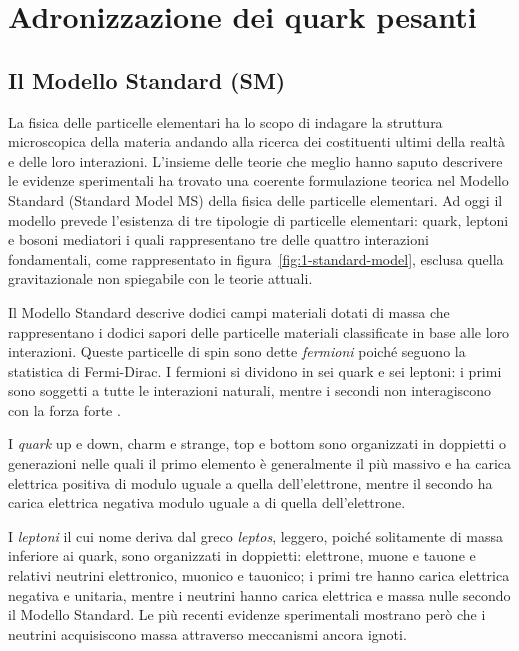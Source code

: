 \chapter{Adronizzazione dei quark pesanti}

\section{Il Modello Standard (SM)}
\label{sec:SM}
    La fisica delle particelle elementari ha lo scopo di indagare la struttura microscopica della materia andando alla ricerca dei costituenti ultimi della realtà e delle loro interazioni. L'insieme delle teorie che meglio hanno saputo descrivere le evidenze sperimentali ha trovato una coerente formulazione teorica nel Modello Standard (Standard Model MS) della fisica delle particelle elementari. Ad oggi il modello prevede l'esistenza di tre tipologie di particelle elementari: quark, leptoni e bosoni mediatori i quali rappresentano tre delle quattro interazioni fondamentali, come rappresentato in figura~\ref{fig:1-standard-model}, esclusa quella gravitazionale non spiegabile con le teorie attuali.
    
    Il Modello Standard descrive dodici campi materiali dotati di massa che rappresentano i dodici sapori delle particelle materiali classificate in base alle loro interazioni. Queste particelle di spin  sono dette \textit{fermioni} poiché seguono la statistica di Fermi-Dirac. I fermioni si dividono in sei quark e sei leptoni: i primi sono soggetti a tutte le interazioni naturali, mentre i secondi non interagiscono con la forza forte \cite{CG_2007}.
    
    I \textit{quark} up e down, charm e strange, top e bottom sono organizzati in doppietti o generazioni nelle quali il primo elemento è generalmente il più massivo e ha carica elettrica positiva di modulo uguale a  quella dell'elettrone, mentre il secondo ha carica elettrica negativa modulo uguale a  di quella dell'elettrone.

    I \textit{leptoni} il cui nome deriva dal greco \textit{leptos}, leggero, poiché solitamente di massa inferiore ai quark, sono organizzati in doppietti: elettrone, muone e tauone e relativi neutrini elettronico, muonico e tauonico; i primi tre hanno carica elettrica negativa e unitaria, mentre i neutrini hanno carica elettrica e massa nulle secondo il Modello Standard. Le più recenti evidenze sperimentali mostrano però che i neutrini acquisiscono massa attraverso meccanismi ancora ignoti.

